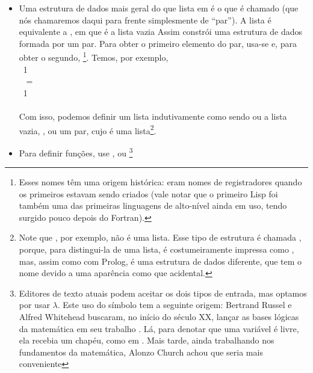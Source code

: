\documentclass{article}
\begin{document}
\begin{itemize}
\item Uma estrutura de dados mais geral do que lista em
   é o que é chamado  (que nós
  chamaremos daqui para frente simplesmente de ``par''). A lista
   é equivalente a , em que  é a lista
  vazia
    Assim  constrói uma estrutura de
    dados formada por um par. Para obter o primeiro elemento do par,
    usa-se  e, para obter o segundo,
    \footnote{Esses nomes têm uma origem histórica:
      eram nomes de registradores quando os primeiros
       estavam sendo criados (vale notar que o
      primeiro Lisp foi também uma das primeiras linguagens de
      alto-nível ainda em uso, tendo surgido pouco depois do Fortran).}. Temos, por exemplo,\\
     \seta\ 1\\
     \seta\  =
    \\
     \seta\ 1\\
     \seta\ \\
    Com isso, podemos definir um lista indutivamente como sendo ou a
    lista vazia, , ou um par, cujo
     é uma lista\footnote{Note que ,
      por exemplo, não é uma lista. Esse tipo de estrutura é chamada
      , porque, para distingui-la de uma lista, é
      costumeiramente impressa como , mas, assim como
      com Prolog, é uma estrutura de dados diferente, que tem o nome
       devido a uma aparência como que acidental.}.
\item Para definir funções, use , ou
  \enphasisb{$\lambda$}\footnote{Editores de texto atuais podem aceitar os dois tipos de
    entrada, mas optamos por usar $\lambda$. Este uso do símbolo tem a
    seguinte origem: Bertrand Russel e Alfred Whitehead buscaram, no
    início do século XX, lançar as bases lógicas da matemática em seu
    trabalho . Lá, para denotar que uma
    variável é livre, ela recebia um chapéu, como em . Mais tarde, ainda trabalhando nos fundamentos da
    matemática, Alonzo Church achou que seria mais conveniente
}
\end{itemize}
\end{document}
